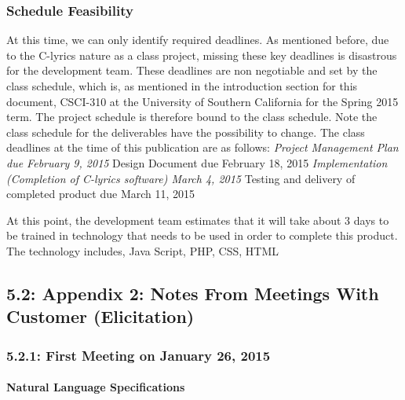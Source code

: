 \documentclass[]{article}
\begin{document}
\subsubsection{Schedule Feasibility}\label{schedule-feasibility}

At this time, we can only identify required deadlines. As mentioned
before, due to the C-lyrics nature as a class project, missing these key
deadlines is disastrous for the development team. These deadlines are
non negotiable and set by the class schedule, which is, as mentioned in
the introduction section for this document, CSCI-310 at the University
of Southern California for the Spring 2015 term. The project schedule is
therefore bound to the class schedule. Note the class schedule for the
deliverables have the possibility to change. The class deadlines at the
time of this publication are as follows: \emph{Project Management Plan
due February 9, 2015 }Design Document due February 18, 2015
\emph{Implementation (Completion of C-lyrics software) March 4, 2015
}Testing and delivery of completed product due March 11, 2015

At this point, the development team estimates that it will take about 3
days to be trained in technology that needs to be used in order to
complete this product. The technology includes, Java Script, PHP, CSS,
HTML

\subsection{5.2: Appendix 2: Notes From Meetings With Customer
(Elicitation)}\label{appendix-2-notes-from-meetings-with-customer-elicitation}

\subsubsection{5.2.1: First Meeting on January 26,
2015}\label{first-meeting-on-january-26-2015}

\paragraph{Natural Language
Specifications}\label{natural-language-specifications}
\end{document}
